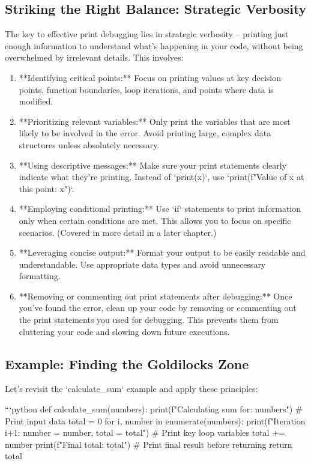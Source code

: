 \documentclass{article}
\begin{document}
{{{\subsection*{Striking the Right Balance: Strategic Verbosity}

The key to effective print debugging lies in strategic verbosity – printing just enough information to understand what's happening in your code, without being overwhelmed by irrelevant details. This involves:

\begin{enumerate}
    \item **Identifying critical points:** Focus on printing values at key decision points, function boundaries, loop iterations, and points where data is modified.
    \item **Prioritizing relevant variables:**  Only print the variables that are most likely to be involved in the error. Avoid printing large, complex data structures unless absolutely necessary.
    \item **Using descriptive messages:**  Make sure your print statements clearly indicate what they're printing.  Instead of `print(x)`, use `print(f"Value of x at this point: {x}")`.
    \item **Employing conditional printing:**  Use `if` statements to print information only when certain conditions are met.  This allows you to focus on specific scenarios.  (Covered in more detail in a later chapter.)
    \item **Leveraging concise output:**  Format your output to be easily readable and understandable.  Use appropriate data types and avoid unnecessary formatting.
    \item **Removing or commenting out print statements after debugging:** Once you've found the error, clean up your code by removing or commenting out the print statements you used for debugging. This prevents them from cluttering your code and slowing down future executions.
\end{enumerate}

\subsection*{Example: Finding the Goldilocks Zone}

Let's revisit the `calculate_sum` example and apply these principles:

```python
def calculate_sum(numbers):
    print(f"Calculating sum for: {numbers}") # Print input data
    total = 0
    for i, number in enumerate(numbers):
        print(f"Iteration {i+1}: number = {number}, total = {total}") # Print key loop variables
        total += number
    print(f"Final total: {total}") # Print final result before returning
    return total

}}}
\end{document}
